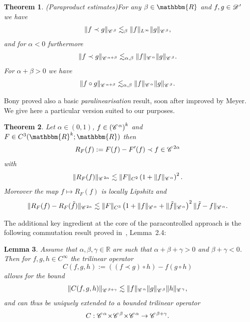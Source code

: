 \documentclass[11pt,reqno]{amsart}
\newcommand{\assign}{:=}
\newcommand{\tmtextit}[1]{{\itshape{#1}}}
\newtheorem{theorem}{Theorem}
\newtheorem{lemma}[theorem]{Lemma}
\newcommand{\CC}{\mathscr{C} \hspace{.1em}}
\newcommand{\CD}{\mathscr{D} \hspace{.1em}}
\begin{document}
\begin{theorem}
  (Paraproduct estimates)\label{thm:paraproduct} For any $\beta \in
  \mathbbm{R}$ and $f, g \in \CD'$ we have
  \begin{equation}
    \label{eq:para-1} \|f \prec g\|_{\CC^{\beta}} \lesssim_{\beta}
    \|f\|_{L^{\infty}} \|g\|_{\CC^{\beta}},
  \end{equation}
  and for $\alpha < 0$ furthermore
  \begin{equation}
    \label{eq:para-2} \|f \prec g\|_{\CC^{\alpha + \beta}} \lesssim_{\alpha,
    \beta} \|f\|_{\CC^{\alpha}} \|g\|_{\CC^{\beta}} .
  \end{equation}
  For $\alpha + \beta > 0$ we have
  \begin{equation}
    \label{eq:para-3} \|f \circ g\|_{\CC^{\alpha + \beta}} \lesssim_{\alpha,
    \beta} \|f\|_{\CC^{\alpha}} \|g\|_{\CC^{\beta}} .
  \end{equation}
\end{theorem}

Bony proved also a basic \tmtextit{paralinearisation} result, soon after
improved by Meyer. We give here a particular version suited to our purposes.

\begin{theorem}
  \label{th:paralinearisation}Let $\alpha \in (0, 1)$, $f \in \left(
  \CC^{\alpha} \right)^k$ and $F \in C^3 (\mathbbm{R}^k ; \mathbbm{R})$ then
  \[ R_F (f) \assign F (f) - F' (f) \prec f \in \CC^{2 \alpha} \]
  with
  \[ \| R_F (f) \|_{\CC^{2 \alpha}} \lesssim \| F \|_{C^2} \left( 1 + \| f
     \|_{\CC^{\alpha}} \right)^2 . \]
  Moreover the map $f \mapsto R_F (f)$ is locally Lipshitz and
  \[ \| R_F (f) - R_F (\tilde{f}) \|_{\CC^{2 \alpha}} \lesssim \| F \|_{C^3}
     \left( 1 + \| f \|_{\CC^{\alpha}} + \| \tilde{f} \|_{\CC^{\alpha}}
     \right)^2 \| \tilde{f} - f \|_{\CC^{\alpha}} . \]
\end{theorem}

The additional key ingredient at the core of the paracontrolled approach is
the following commutation result proved
in~{\cite{gubinelli_paracontrolled_2015}}, Lemma~2.4:

\begin{lemma}
  \label{lem:commutator} Assume that $\alpha, \beta, \gamma \in \mathbb{R}$
  are such that $\alpha + \beta + \gamma > 0$ and $\beta + \gamma < 0$. Then
  for $f, g, h \in C^{\infty}$ the trilinear operator
  \[ C (f, g, h) \assign ((f \prec g) \circ h) - f (g \circ h) \]
  allows for the bound
  \begin{equation}
    \label{eq:commutator bound} \|C (f, g, h)\|_{\CC^{\beta + \gamma}}
    \lesssim \|f\|_{\CC^{\alpha}} \|g\|_{\CC^{\beta}} \|h\|_{\CC^{\gamma}},
  \end{equation}
  and can thus be uniquely extended to a bounded trilinear operator
  \[ C : \CC^{\alpha} \hspace{-0.17em} \times \hspace{-0.17em} \CC^{\beta}
     \hspace{-0.17em} \times \hspace{-0.17em} \CC^{\alpha} \rightarrow
     \CC^{\beta + \gamma} . \]
\end{lemma}
\end{document}
